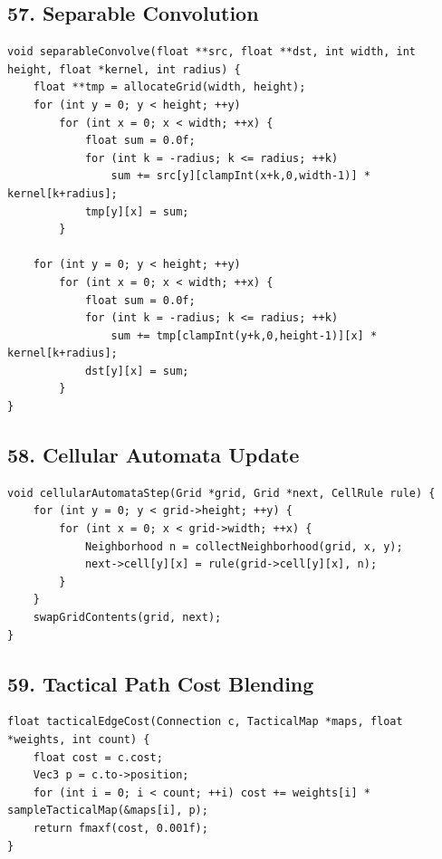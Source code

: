 \documentclass[10pt,letterpaper]{article}
\begin{document}
\subsection*{57. Separable Convolution}
{}

\begin{verbatim}
void separableConvolve(float **src, float **dst, int width, int height, float *kernel, int radius) {
    float **tmp = allocateGrid(width, height);
    for (int y = 0; y < height; ++y)
        for (int x = 0; x < width; ++x) {
            float sum = 0.0f;
            for (int k = -radius; k <= radius; ++k)
                sum += src[y][clampInt(x+k,0,width-1)] * kernel[k+radius];
            tmp[y][x] = sum;
        }

    for (int y = 0; y < height; ++y)
        for (int x = 0; x < width; ++x) {
            float sum = 0.0f;
            for (int k = -radius; k <= radius; ++k)
                sum += tmp[clampInt(y+k,0,height-1)][x] * kernel[k+radius];
            dst[y][x] = sum;
        }
}
\end{verbatim}

\subsection*{58. Cellular Automata Update}
{}

\begin{verbatim}
void cellularAutomataStep(Grid *grid, Grid *next, CellRule rule) {
    for (int y = 0; y < grid->height; ++y) {
        for (int x = 0; x < grid->width; ++x) {
            Neighborhood n = collectNeighborhood(grid, x, y);
            next->cell[y][x] = rule(grid->cell[y][x], n);
        }
    }
    swapGridContents(grid, next);
}
\end{verbatim}

\subsection*{59. Tactical Path Cost Blending}
{}

\begin{verbatim}
float tacticalEdgeCost(Connection c, TacticalMap *maps, float *weights, int count) {
    float cost = c.cost;
    Vec3 p = c.to->position;
    for (int i = 0; i < count; ++i) cost += weights[i] * sampleTacticalMap(&maps[i], p);
    return fmaxf(cost, 0.001f);
}
\end{verbatim}
\end{document}
